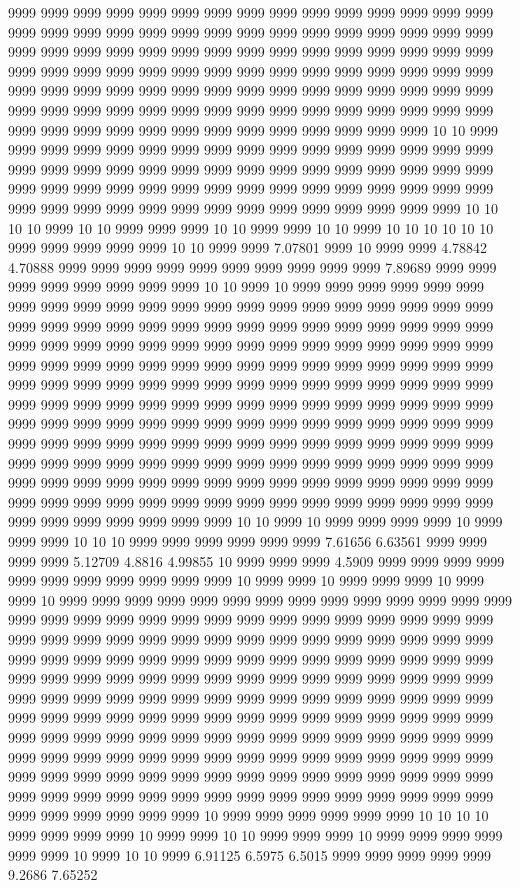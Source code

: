 9999 9999 9999 9999 9999 9999 9999 9999 9999 9999 9999 9999 9999 9999 9999 9999 9999 9999 9999 9999 9999 9999 9999 9999 9999 9999 9999 9999 9999 9999 9999 9999 9999 9999 9999 9999 9999 9999 9999 9999 9999 9999 9999 9999 9999 9999 9999 9999 9999 9999 9999 9999 9999 9999 9999 9999 9999 9999 9999 9999 9999 9999 9999 9999 9999 9999 9999 9999 9999 9999 9999 9999 9999 9999 9999 9999 9999 9999 9999 9999 9999 9999 9999 9999 9999 9999 9999 9999 9999 9999 9999 9999 9999 9999 9999 9999 9999 9999 9999 9999 9999 9999 9999 10 10 9999 9999 9999 9999 9999 9999 9999 9999 9999 9999 9999 9999 9999 9999 9999 9999 9999 9999 9999 9999 9999 9999 9999 9999 9999 9999 9999 9999 9999 9999 9999 9999 9999 9999 9999 9999 9999 9999 9999 9999 9999 9999 9999 9999 9999 9999 9999 9999 9999 9999 9999 9999 9999 9999 9999 9999 9999 9999 9999 9999 10 10 10 10 9999 10 10 9999 9999 9999 10 10 9999 9999 10 10 9999 10 10 10 10 10 10 9999 9999 9999 9999 9999 10 10 9999 9999 7.07801 9999 10 9999 9999 4.78842 4.70888 9999 9999 9999 9999 9999 9999 9999 9999 9999 9999 7.89689 9999 9999 9999 9999 9999 9999 9999 9999 10 10 9999 10 9999 9999 9999 9999 9999 9999 9999 9999 9999 9999 9999 9999 9999 9999 9999 9999 9999 9999 9999 9999 9999 9999 9999 9999 9999 9999 9999 9999 9999 9999 9999 9999 9999 9999 9999 9999 9999 9999 9999 9999 9999 9999 9999 9999 9999 9999 9999 9999 9999 9999 9999 9999 9999 9999 9999 9999 9999 9999 9999 9999 9999 9999 9999 9999 9999 9999 9999 9999 9999 9999 9999 9999 9999 9999 9999 9999 9999 9999 9999 9999 9999 9999 9999 9999 9999 9999 9999 9999 9999 9999 9999 9999 9999 9999 9999 9999 9999 9999 9999 9999 9999 9999 9999 9999 9999 9999 9999 9999 9999 9999 9999 9999 9999 9999 9999 9999 9999 9999 9999 9999 9999 9999 9999 9999 9999 9999 9999 9999 9999 9999 9999 9999 9999 9999 9999 9999 9999 9999 9999 9999 9999 9999 9999 9999 9999 9999 9999 9999 9999 9999 9999 9999 9999 9999 9999 9999 9999 9999 9999 9999 9999 9999 9999 9999 9999 9999 9999 9999 9999 9999 9999 9999 9999 9999 9999 9999 9999 9999 10 10 9999 10 9999 9999 9999 9999 10 9999 9999 9999 10 10 10 9999 9999 9999 9999 9999 9999 7.61656 6.63561 9999 9999 9999 9999 5.12709 4.8816 4.99855 10 9999 9999 9999 4.5909 9999 9999 9999 9999 9999 9999 9999 9999 9999 9999 9999 10 9999 9999 10 9999 9999 9999 10 9999 9999 10 9999 9999 9999 9999 9999 9999 9999 9999 9999 9999 9999 9999 9999 9999 9999 9999 9999 9999 9999 9999 9999 9999 9999 9999 9999 9999 9999 9999 9999 9999 9999 9999 9999 9999 9999 9999 9999 9999 9999 9999 9999 9999 9999 9999 9999 9999 9999 9999 9999 9999 9999 9999 9999 9999 9999 9999 9999 9999 9999 9999 9999 9999 9999 9999 9999 9999 9999 9999 9999 9999 9999 9999 9999 9999 9999 9999 9999 9999 9999 9999 9999 9999 9999 9999 9999 9999 9999 9999 9999 9999 9999 9999 9999 9999 9999 9999 9999 9999 9999 9999 9999 9999 9999 9999 9999 9999 9999 9999 9999 9999 9999 9999 9999 9999 9999 9999 9999 9999 9999 9999 9999 9999 9999 9999 9999 9999 9999 9999 9999 9999 9999 9999 9999 9999 9999 9999 9999 9999 9999 9999 9999 9999 9999 9999 9999 9999 9999 9999 9999 9999 9999 9999 9999 9999 9999 9999 9999 9999 9999 9999 9999 9999 9999 9999 9999 9999 9999 9999 9999 9999 10 9999 9999 9999 9999 9999 9999 10 10 10 10 9999 9999 9999 9999 10 9999 9999 10 10 9999 9999 9999 10 9999 9999 9999 9999 9999 9999 10 9999 10 10 9999 6.91125 6.5975 6.5015 9999 9999 9999 9999 9999 9.2686 7.65252 